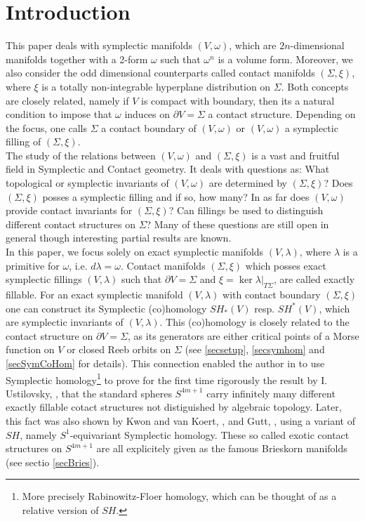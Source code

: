 \documentclass[a4paper,12pt,bibliography=totocnumbered,titlepage=false,abstracton,bookmarksnumbered=true]{scrartcl}
\theoremstyle{definition}
\begin{document}
\section{Introduction}
This paper deals with symplectic manifolds $(V,\omega)$, which are $2n$-dimensional manifolds together with a 2-form $\omega$ such that $\omega^n$ is a volume form. Moreover, we also consider the odd dimensional counterparts called contact manifolds $(\Sigma,\xi)$, where $\xi$ is a totally non-integrable hyperplane distribution on $\Sigma$. Both concepts are closely related, namely if $V$ is compact with boundary, then its a natural condition to impose that $\omega$ induces on $\partial V=\Sigma$ a contact structure. Depending on the focus, one calls $\Sigma$ a contact  boundary of $(V,\omega)$ or $(V,\omega)$ a symplectic filling of $(\Sigma,\xi)$.\\
The study of the relations between $(V,\omega)$ and $(\Sigma,\xi)$ is a vast and fruitful field in Symplectic and Contact geometry. It deals with questions as: What topological or symplectic invariants of $(V,\omega)$ are determined by $(\Sigma,\xi)$? Does $(\Sigma,\xi)$ posses a symplectic filling and if so, how many? In as far does $(V,\omega)$ provide contact invariants for $(\Sigma,\xi)$? Can fillings be used to distinguish different contact structures on $\Sigma$? Many of these questions are still open in general though interesting partial results are known.\\
In this paper, we focus solely on exact symplectic manifolds $(V,\lambda)$, where $\lambda$ is a primitive for $\omega$, i.e. $d\lambda=\omega$. Contact manifolds $(\Sigma,\xi)$ which posses exact symplectic fillings $(V,\lambda)$ such that $\partial V=\Sigma$ and $\xi=\ker \lambda|_{T\Sigma}$, are called exactly fillable. For an exact symplectic manifold $(V,\lambda)$ with contact boundary $(\Sigma,\xi)$ one can construct its Symplectic (co)homology $SH_\ast(V)$ resp. $SH^\ast(V)$, which are symplectic invariants of $(V,\lambda)$. This (co)homology is closely related to the contact structure on $\partial V=\Sigma$, as its generators are either critical points of a Morse function on $V$ or closed Reeb orbits on $\Sigma$ (see \ref{secsetup}, \ref{secsymhom} and \ref{secSymCoHom} for details). This connection enabled the author in \cite{Fauck1} to use Symplectic homology\footnote{More precisely Rabinowitz-Floer homology, which can be thought of as a relative version of $SH$.} to prove for the first time rigorously the result by I. Ustilovsky, \cite{Usti}, that the standard spheres $S^{4m+1}$ carry infinitely many different exactly fillable cotact structures not distiguished by algebraic topology. Later, this fact was also shown by Kwon and van Koert, \cite{KwKo}, and Gutt, \cite{Gutt2}, using a variant of $SH$, namely $S^1$-equivariant Symplectic homology. These so called exotic contact structures on $S^{4m+1}$ are all explicitely given as the famous Brieskorn manifolds (see sectio \ref{secBries}).\\
\end{document}
